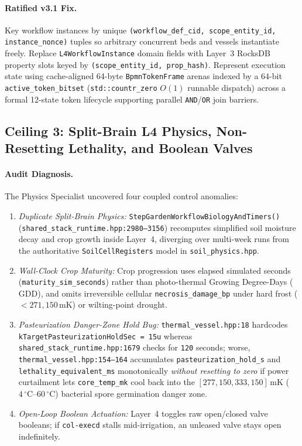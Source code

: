 \paragraph{Ratified v3.1 Fix.}
Key workflow instances by unique \texttt{(workflow\_def\_cid, scope\_entity\_id, instance\_nonce)} tuples so arbitrary concurrent beds and vessels instantiate freely. Replace \texttt{L4WorkflowInstance} domain fields with Layer~3 RocksDB property slots keyed by \texttt{(scope\_entity\_id, prop\_hash)}. Represent execution state using cache-aligned 64-byte \texttt{BpmnTokenFrame} arenas indexed by a 64-bit \texttt{active\_token\_bitset} (\texttt{std::countr\_zero} $O(1)$ runnable dispatch) across a formal 12-state token lifecycle supporting parallel \texttt{AND}/\texttt{OR} join barriers.

\subsection{Ceiling 3: Split-Brain L4 Physics, Non-Resetting Lethality, and Boolean Valves}

\paragraph{Audit Diagnosis.}
The Physics Specialist uncovered four coupled control anomalies:
\begin{enumerate}
  \item \emph{Duplicate Split-Brain Physics:} \texttt{StepGardenWorkflowBiologyAndTimers()} (\texttt{shared\_stack\_runtime.hpp:2980--3156}) recomputes simplified soil moisture decay and crop growth inside Layer~4, diverging over multi-week runs from the authoritative \texttt{SoilCellRegisters} model in \texttt{soil\_physics.hpp}.
  \item \emph{Wall-Clock Crop Maturity:} Crop progression uses elapsed simulated seconds (\texttt{maturity\_sim\_seconds}) rather than photo-thermal Growing Degree-Days ($\text{GDD}$), and omits irreversible cellular \texttt{necrosis\_damage\_bp} under hard frost ($<271{,}150\,\text{mK}$) or wilting-point drought.
  \item \emph{Pasteurization Danger-Zone Hold Bug:} \texttt{thermal\_vessel.hpp:18} hardcodes \texttt{kTargetPasteurizationHoldSec = 15u} whereas \texttt{shared\_stack\_runtime.hpp:1679} checks for \texttt{120} seconds; worse, \texttt{thermal\_vessel.hpp:154--164} accumulates \texttt{pasteurization\_hold\_s} and \texttt{lethality\_equivalent\_ms} monotonically \emph{without resetting to zero} if power curtailment lets \texttt{core\_temp\_mk} cool back into the $[277{,}150, 333{,}150]\,\text{mK}$ ($4\,^\circ\text{C}\text{--}60\,^\circ\text{C}$) bacterial spore germination danger zone.
  \item \emph{Open-Loop Boolean Actuation:} Layer~4 toggles raw open/closed valve booleans; if \texttt{col-execd} stalls mid-irrigation, an unleased valve stays open indefinitely.
\end{enumerate}

